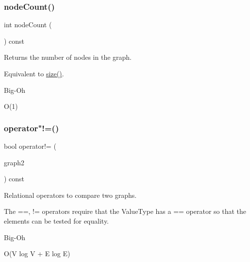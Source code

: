 \subsubsection{\texorpdfstring{node\+Count()}{nodeCount()}}
{\footnotesize\ttfamily int node\+Count (\begin{DoxyParamCaption}{ }\end{DoxyParamCaption}) const\hspace{0.3cm}{\ttfamily [inherited]}}



Returns the number of nodes in the graph. 

Equivalent to \mbox{\hyperlink{classGraph_af9593d4a5ff4274efaf429cb4f9e57cc}{size()}}. \begin{DoxyRefDesc}{Big-\/\+Oh}
\item[\mbox{\hyperlink{BigOh__BigOh000083}{Big-\/\+Oh}}]O(1) \end{DoxyRefDesc}
\mbox{\label{classGraph_aafd8d1cec3a4d6b8cdcb58016e4d093a}} 
\subsubsection{\texorpdfstring{operator"!=()}{operator!=()}}
{\footnotesize\ttfamily bool operator!= (\begin{DoxyParamCaption}\item[{const \mbox{\hyperlink{classGraph}{Graph}}$<$ \mbox{\hyperlink{classVertexGen}{Vertex\+Gen}}$<$ V, E $>$, Edge\+Gen$<$ V, E $>$ $>$ \&}]{graph2 }\end{DoxyParamCaption}) const\hspace{0.3cm}{\ttfamily [inherited]}}



Relational operators to compare two graphs. 

The ==, != operators require that the Value\+Type has a == operator so that the elements can be tested for equality. \begin{DoxyRefDesc}{Big-\/\+Oh}
\item[\mbox{\hyperlink{BigOh__BigOh000094}{Big-\/\+Oh}}]O(V log V + E log E) \end{DoxyRefDesc}
\mbox{\label{classGraph_a1daf423faecc777e29a399812dc39ca2}} 
